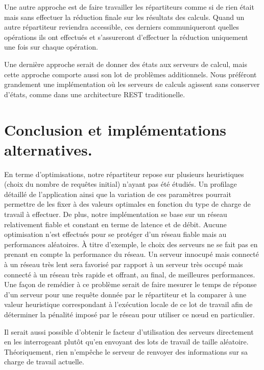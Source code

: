 Une autre approche est de faire travailler les répartiteurs comme si de rien était mais sans effectuer la réduction finale sur les résultats des calculs. Quand un autre répartiteur reviendra accessible, 
ces derniers communiqueront quelles opérations ils ont effectués et s'assureront d'effectuer la réduction uniquement une fois sur chaque opération. 

Une dernière approche serait de donner des états aux serveurs de calcul, mais cette approche comporte aussi son lot de problèmes additionnels. 
Nous préféront grandement une implémentation où les serveurs de calculs agissent sans conserver d'états, comme dans une architecture REST traditionelle. 

\section{Conclusion et implémentations alternatives.}

En terme d'optimisations, notre répartiteur repose sur plusieurs heuristiques (choix du nombre de requêtes initial) n'ayant pas été étudiés. 
Un profilage détaillé de l'application ainsi que la variation de ces paramètres pourrait permettre de les fixer à des valeurs optimales en fonction
du type de charge de travail à effectuer. De plus, notre implémentation se base sur un réseau relativement fiable et constant en terme de latence et de débit. 
Aucune optimisation n'est effectués pour se protéger d'un réseau fiable mais au performances aléatoires. À titre d'exemple, le choix des serveurs ne se fait pas 
en prenant en compte la performance du réseau. Un serveur innocupé mais connecté à un réseau très lent sera favorisé par rapport à un serveur très occupé mais connecté
à un réseau très rapide et offrant, au final, de meilleures performances. Une façon de remédier à ce problème serait de faire mesurer le temps de réponse d'un serveur
pour une requête donnée par le répartiteur et la comparer à une valeur heuristique correspondant à l'exécution locale de ce lot de travail afin de déterminer la
pénalité imposé par le réseau pour utiliser ce nœud en particulier. 

Il serait aussi possible d’obtenir le facteur d'utilisation des serveurs directement en les interrogeant plutôt qu'en envoyant des lots de travail de taille 
aléatoire. Théoriquement, rien n'empêche le serveur de renvoyer des informations sur sa charge de travail actuelle.






%
%
%
%
%
%
